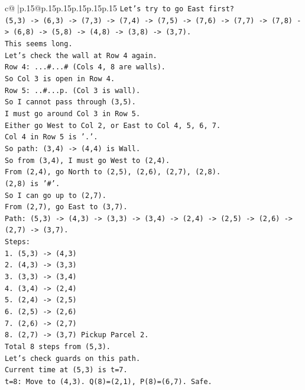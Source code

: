 \documentclass{article}
\begin{document}
{\begin{supertabular}{c@{$\;$}|p{.15\linewidth}@{}p{.15\linewidth}p{.15\linewidth}p{.15\linewidth}p{.15\linewidth}p{.15\linewidth}}
{{{\texttt{Let's try to go East first?} \\
\texttt{(5,3) {-}> (6,3) {-}> (7,3) {-}> (7,4) {-}> (7,5) {-}> (7,6) {-}> (7,7) {-}> (7,8) {-}> (6,8) {-}> (5,8) {-}> (4,8) {-}> (3,8) {-}> (3,7).} \\
\texttt{This seems long.} \\
\texttt{Let's check the wall at Row 4 again.} \\
\texttt{Row 4: ...\#...\# (Cols 4, 8 are walls).} \\
\texttt{So Col 3 is open in Row 4.} \\
\texttt{Row 5: ..\#...p. (Col 3 is wall).} \\
\texttt{So I cannot pass through (3,5).} \\
\texttt{I must go around Col 3 in Row 5.} \\
\texttt{Either go West to Col 2, or East to Col 4, 5, 6, 7.} \\
\texttt{Col 4 in Row 5 is '.'.} \\
\texttt{So path: (3,4) {-}> (4,4) is Wall.} \\
\texttt{So from (3,4), I must go West to (2,4).} \\
\texttt{From (2,4), go North to (2,5), (2,6), (2,7), (2,8).} \\
\texttt{(2,8) is '\#'.} \\
\texttt{So I can go up to (2,7).} \\
\texttt{From (2,7), go East to (3,7).} \\
\texttt{Path: (5,3) {-}> (4,3) {-}> (3,3) {-}> (3,4) {-}> (2,4) {-}> (2,5) {-}> (2,6) {-}> (2,7) {-}> (3,7).} \\
\texttt{Steps:} \\
\texttt{1. (5,3) {-}> (4,3)} \\
\texttt{2. (4,3) {-}> (3,3)} \\
\texttt{3. (3,3) {-}> (3,4)} \\
\texttt{4. (3,4) {-}> (2,4)} \\
\texttt{5. (2,4) {-}> (2,5)} \\
\texttt{6. (2,5) {-}> (2,6)} \\
\texttt{7. (2,6) {-}> (2,7)} \\
\texttt{8. (2,7) {-}> (3,7) Pickup Parcel 2.} \\
\texttt{Total 8 steps from (5,3).} \\
\texttt{Let's check guards on this path.} \\
\texttt{Current time at (5,3) is t=7.} \\
\texttt{t=8: Move to (4,3). Q(8)=(2,1), P(8)=(6,7). Safe.} \\
}}}
\end{supertabular}}
\end{document}
